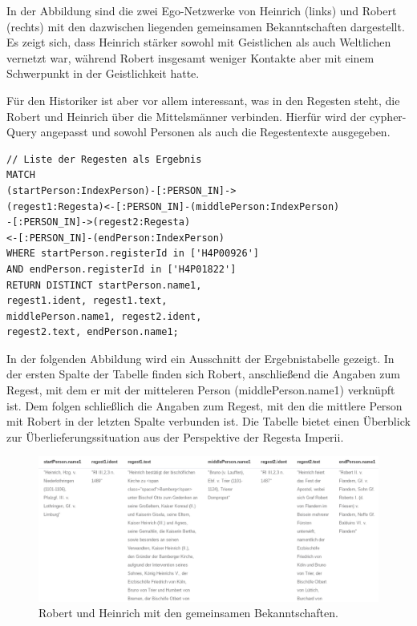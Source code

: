 \documentclass[ngerman,]{scrreprt}
\begin{document}
In der Abbildung sind die zwei Ego-Netzwerke von Heinrich (links) und Robert (rechts) mit den dazwischen liegenden gemeinsamen Bekanntschaften dargestellt. Es zeigt sich, dass Heinrich stärker sowohl mit Geistlichen als auch Weltlichen vernetzt war, während Robert insgesamt weniger Kontakte aber mit einem Schwerpunkt in der Geistlichkeit hatte.

Für den Historiker ist aber vor allem interessant, was in den Regesten steht, die Robert und Heinrich über die Mittelsmänner verbinden. Hierfür wird der cypher-Query angepasst und sowohl Personen als auch die Regestentexte ausgegeben.

\begin{verbatim}
// Liste der Regesten als Ergebnis
MATCH
(startPerson:IndexPerson)-[:PERSON_IN]->
(regest1:Regesta)<-[:PERSON_IN]-(middlePerson:IndexPerson)
-[:PERSON_IN]->(regest2:Regesta)
<-[:PERSON_IN]-(endPerson:IndexPerson)
WHERE startPerson.registerId in ['H4P00926']
AND endPerson.registerId in ['H4P01822']
RETURN DISTINCT startPerson.name1,
regest1.ident, regest1.text,
middlePerson.name1, regest2.ident,
regest2.text, endPerson.name1;
\end{verbatim}

In der folgenden Abbildung wird ein Ausschnitt der Ergebnistabelle gezeigt. In der ersten Spalte der Tabelle finden sich Robert, anschließend die Angaben zum Regest, mit dem er mit der mitteleren Person (middlePerson.name1) verknüpft ist. Dem folgen schließlich die Angaben zum Regest, mit den die mittlere Person mit Robert in der letzten Spalte verbunden ist. Die Tabelle bietet einen Überblick zur Überlieferungssituation aus der Perspektive der Regesta Imperii.

\begin{figure}
\centering
\includegraphics{Bilder/RI2Graph/RobertHeinrichApocTabelle.png}
\caption{Robert und Heinrich mit den gemeinsamen Bekanntschaften.}
\end{figure}
\end{document}
